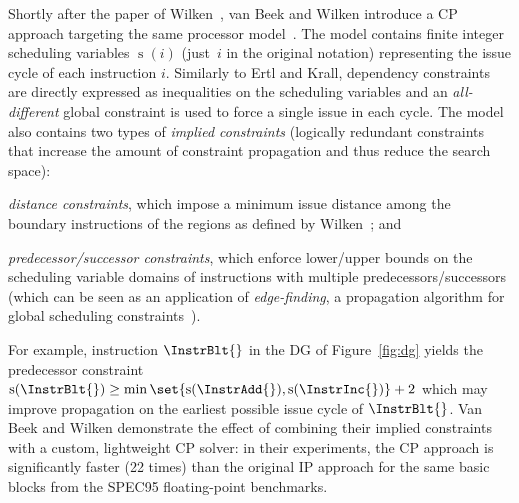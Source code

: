 \documentclass[acmsmall,authorversion,nonacm]{acmart}
\newcommand{\noMathVar}[2]{\operatorname{#1}(#2)}
\newcommand{\var}[2]{$\noMathVar{#1}{#2}$}
\begin{document}
Shortly after the paper of Wilken~\etal{}, van Beek and Wilken
introduce a CP approach targeting the same processor
model~\cite{VanBeek2001}.
The model contains finite integer scheduling variables \var{s}{i}
(just~$i$ in the original notation) representing the issue cycle of
each instruction $i$.
Similarly to Ertl and Krall, dependency constraints are directly
expressed as inequalities on the scheduling variables and an
\emph{all-different} global constraint is used to force a single issue
in each cycle.
The model also contains two types of \emph{implied constraints}
(logically redundant constraints that increase the amount of
constraint propagation and thus reduce the search space):
\begin{inparaitem}[]
\item \emph{distance constraints}, which impose a minimum issue
  distance among the boundary instructions of the regions as defined
  by Wilken~\etal{}; and
\item \emph{predecessor/successor constraints}, which enforce
  lower/upper bounds on the scheduling variable domains of
  instructions with multiple predecessors/successors (which can be
  seen as an application of \emph{edge-finding}, a propagation
  algorithm for global scheduling constraints~\cite{CPH:global}).
\end{inparaitem}
For example, instruction $\InstrBlt{}$ in the DG of
Figure~\ref{fig:dg} yields the predecessor constraint
$\noMathVar{s}{\InstrBlt{}} \ge \min \set{\noMathVar{s}{\InstrAdd{}},
  \noMathVar{s}{\InstrInc{}}} + 2$ which may improve propagation on
the earliest possible issue cycle of $\InstrBlt{}$.
Van Beek and Wilken demonstrate the effect of combining their implied
constraints with a custom, lightweight CP solver: in their
experiments, the CP approach is significantly faster (22 times) than
the original IP approach for the same basic blocks from the SPEC95
floating-point benchmarks.
\end{document}
